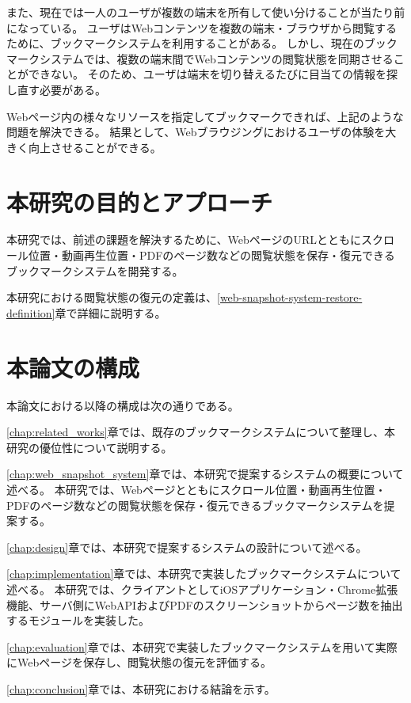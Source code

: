 また、現在では一人のユーザが複数の端末を所有して使い分けることが当たり前になっている。
ユーザはWebコンテンツを複数の端末・ブラウザから閲覧するために、ブックマークシステムを利用することがある。
しかし、現在のブックマークシステムでは、複数の端末間でWebコンテンツの閲覧状態を同期させることができない。
そのため、ユーザは端末を切り替えるたびに目当ての情報を探し直す必要がある。

Webページ内の様々なリソースを指定してブックマークできれば、上記のような問題を解決できる。
結果として、Webブラウジングにおけるユーザの体験を大きく向上させることができる。

\section{本研究の目的とアプローチ}
本研究では、前述の課題を解決するために、WebページのURLとともにスクロール位置・動画再生位置・PDFのページ数などの閲覧状態を保存・復元できるブックマークシステムを開発する。

本研究における閲覧状態の復元の定義は、\ref{web-snapshot-system-restore-definition}章で詳細に説明する。

\section{本論文の構成}

本論文における以降の構成は次の通りである。

\ref{chap:related_works}章では、既存のブックマークシステムについて整理し、本研究の優位性について説明する。

\ref{chap:web_snapshot_system}章では、本研究で提案するシステムの概要について述べる。
本研究では、Webページとともにスクロール位置・動画再生位置・PDFのページ数などの閲覧状態を保存・復元できるブックマークシステムを提案する。

\ref{chap:design}章では、本研究で提案するシステムの設計について述べる。

\ref{chap:implementation}章では、本研究で実装したブックマークシステムについて述べる。
本研究では、クライアントとしてiOSアプリケーション・Chrome拡張機能、サーバ側にWebAPIおよびPDFのスクリーンショットからページ数を抽出するモジュールを実装した。

\ref{chap:evaluation}章では、本研究で実装したブックマークシステムを用いて実際にWebページを保存し、閲覧状態の復元を評価する。

\ref{chap:conclusion}章では、本研究における結論を示す。